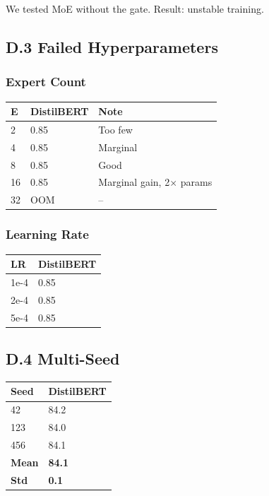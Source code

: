 We tested MoE without the gate. Result: unstable training.

\subsection{D.3 Failed Hyperparameters}

\subsubsection{Expert Count}

\begin{table}[H]
\centering
\small
\begin{tabular}{lll}
\toprule
\textbf{E} & \textbf{DistilBERT} & \textbf{Note} \\
\midrule
2 & 0.85 & Too few \\
4 & 0.85 & Marginal \\
8 & 0.85 & Good \\
16 & 0.85 & Marginal gain, 2$\times$ params \\
32 & OOM & -- \\
\bottomrule
\end{tabular}
\end{table}

\subsubsection{Learning Rate}

\begin{table}[H]
\centering
\small
\begin{tabular}{ll}
\toprule
\textbf{LR} & \textbf{DistilBERT} \\
\midrule
1e-4 & 0.85 \\
2e-4 & 0.85 \\
5e-4 & 0.85 \\
\bottomrule
\end{tabular}
\end{table}

\subsection{D.4 Multi-Seed}

\begin{table}[H]
\centering
\small
\begin{tabular}{ll}
\toprule
\textbf{Seed} & \textbf{DistilBERT} \\
\midrule
42 & 84.2 \\
123 & 84.0 \\
456 & 84.1 \\
\textbf{Mean} & \textbf{84.1} \\
\textbf{Std} & \textbf{0.1} \\
\bottomrule
\end{tabular}
\end{table}

